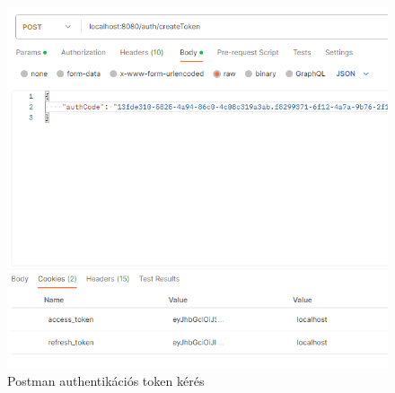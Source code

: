 \documentclass[a4paper,twoside]{article}
\begin{document}
\begin{figure}[h]
	\caption{Postman authentikációs token kérés}
	\label{fig:postman}
	\centering
	\includegraphics[scale=0.5]{getTokens}
\end{figure}
\end{document}
